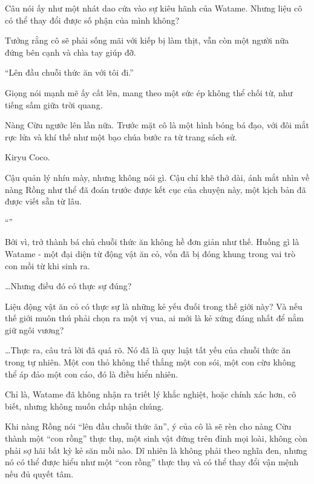 \documentclass[../main.tex]{subfiles}
\begin{document}
Câu nói ấy như một nhát dao cứa vào sự kiêu hãnh của Watame. Nhưng liệu cô có thể thay đổi được số phận của mình không?

Tưởng rằng cô sẽ phải sống mãi với kiếp bị làm thịt, vẫn còn một người nữa đứng bên cạnh và chìa tay giúp đỡ.

``Lên đầu chuỗi thức ăn với tôi đi.''


Giọng nói mạnh mẽ ấy cất lên, mang theo một sức ép không thể chối từ, như tiếng sấm giữa trời quang.

Nàng Cừu ngước lên lần nữa. Trước mặt cô là một hình bóng bá đạo, với đôi mắt rực lửa và khí thế như một bạo chúa bước ra từ trang sách sử.

Kiryu Coco.

Cậu quản lý nhíu mày, nhưng không nói gì. Cậu chỉ khẽ thở dài, ánh mắt nhìn về nàng Rồng như thể đã đoán trước được kết cục của chuyện này, một kịch bản đã được viết sẵn từ lâu.

``\textit{}''

Bởi vì, trở thành bá chủ chuỗi thức ăn không hề đơn giản như thế. Huống gì là Watame - một đại diện từ động vật ăn cỏ, vốn đã bị đóng khung trong vai trò con mồi từ khi sinh ra.

\dots Nhưng điều đó có thực sự đúng?

Liệu động vật ăn cỏ có thực sự là những kẻ yếu đuối trong thế giới này? Và nếu thế giới muôn thú phải chọn ra một vị vua, ai mới là kẻ xứng đáng nhất để nắm giữ ngôi vương?

\dots Thực ra, câu trả lời đã quá rõ. Nó đã là quy luật tất yếu của chuỗi thức ăn trong tự nhiên. Một con thỏ không thể thắng một con sói, một con cừu không thể áp đảo một con cáo, đó là điều hiển nhiên.

Chỉ là, Watame đã không nhận ra triết lý khắc nghiệt, hoặc chính xác hơn, cô biết, nhưng không muốn chấp nhận chúng.

\ct

Khi nàng Rồng nói ``lên đầu chuỗi thức ăn'', ý của cô là sẽ rèn cho nàng Cừu thành một ``con rồng'' thực thụ, một sinh vật đứng trên đỉnh mọi loài, không còn phải sợ hãi bất kỳ kẻ săn mồi nào. Dĩ nhiên là không phải theo nghĩa đen, nhưng nó có thể được hiểu như một ``con rồng'' thực thụ và có thể thay đổi vận mệnh nếu đủ quyết tâm.
\end{document}
